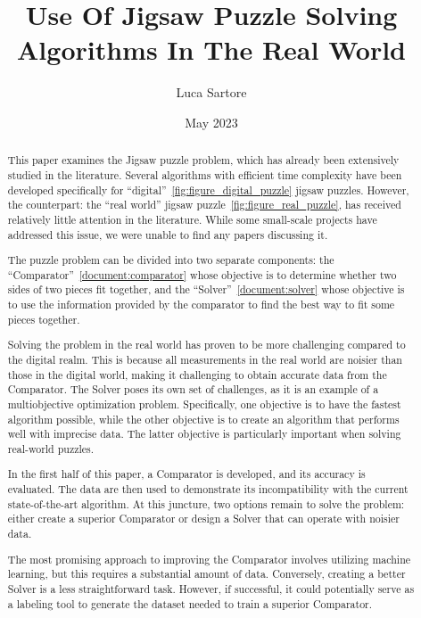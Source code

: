\documentclass{article}
\title{Use Of Jigsaw Puzzle Solving Algorithms In The Real World}
\author{Luca Sartore}
\date{May 2023}
\begin{document}
\maketitle

\newpage

{
  \hypersetup{linkcolor=black}
  \tableofcontents
}

\newpage

\begin{abstract}
This paper examines the Jigsaw puzzle problem,
which has already been extensively studied in the literature.
Several algorithms with efficient time complexity have been developed
specifically for ``digital''~\cref{fig:figure_digital_puzzle} jigsaw puzzles. However, the counterpart:
the ``real world'' jigsaw puzzle~\cref{fig:figure_real_puzzle}, has received relatively little attention
in the literature. While some small-scale projects have addressed this issue,
we were unable to find any papers discussing it.

The puzzle problem can be divided into two separate components: the ``Comparator''~\cref{document:comparator}
whose objective is to determine whether two sides of two pieces fit together,
and the ``Solver''~\cref{document:solver} whose objective is to use the information provided
by the comparator to find the best way to fit some pieces together.

Solving the problem in the real world has proven to be more challenging compared
to the digital realm.
This is because all measurements in the real world are noisier than those
in the digital world, making it challenging to obtain accurate data from the Comparator.
The Solver poses its own set of challenges, as it is an example of a
multiobjective optimization problem. Specifically, one objective is to have
the fastest algorithm possible,
while the other objective is to create an algorithm that performs well with
imprecise data. The latter objective is particularly important when solving
real-world puzzles.

In the first half of this paper, a Comparator is developed, and its accuracy
is evaluated.
The data are then used to demonstrate its incompatibility with the current
state-of-the-art algorithm. At this juncture,
two options remain to solve the problem:
either create a superior Comparator or design a
Solver that can operate with noisier data.

The most promising approach to improving the Comparator
involves utilizing machine learning, but this requires a substantial amount of data.
Conversely, creating a better Solver is a less straightforward task.
However, if successful, it could potentially serve as a labeling tool
to generate the dataset needed to train a superior Comparator.


\end{abstract}
\end{document}
